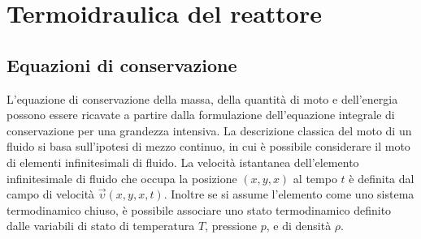 \chapter{Termoidraulica del reattore \label{cap3}}


\section{Equazioni di conservazione}
L'equazione di conservazione della massa, della quantità di moto e 
dell'energia 
possono essere ricavate a partire dalla formulazione dell'equazione integrale 
di 
conservazione per una grandezza intensiva.
La descrizione classica del moto di un fluido si basa sull'ipotesi di mezzo 
continuo, in cui è possibile considerare il moto di elementi infinitesimali di 
fluido.
La velocità istantanea dell'elemento infinitesimale di fluido che occupa la 
posizione $(x,y,x)$ al tempo $t$ è definita dal campo di velocità 
$\vec{\upsilon}(x,y,x,t)$.
Inoltre se si assume l'elemento come uno sistema termodinamico chiuso, è 
possibile associare uno stato termodinamico definito dalle variabili di stato 
di 
temperatura $T$, pressione $p$, e di densità $\rho$.


